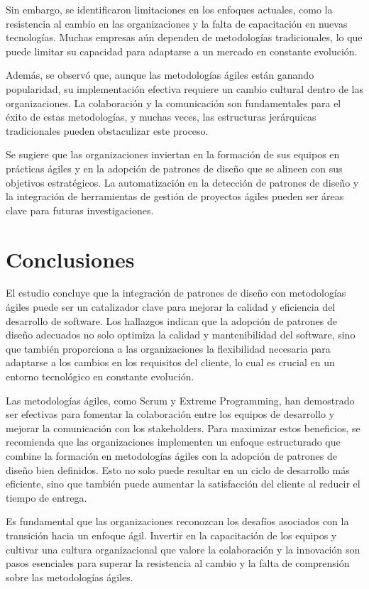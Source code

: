 \documentclass{article}
\begin{document}
Sin embargo, se identificaron limitaciones en los enfoques actuales, como la resistencia al cambio en las organizaciones y la falta de capacitación en nuevas tecnologías. Muchas empresas aún dependen de metodologías tradicionales, lo que puede limitar su capacidad para adaptarse a un mercado en constante evolución.

Además, se observó que, aunque las metodologías ágiles están ganando popularidad, su implementación efectiva requiere un cambio cultural dentro de las organizaciones. La colaboración y la comunicación son fundamentales para el éxito de estas metodologías, y muchas veces, las estructuras jerárquicas tradicionales pueden obstaculizar este proceso.

Se sugiere que las organizaciones inviertan en la formación de sus equipos en prácticas ágiles y en la adopción de patrones de diseño que se alineen con sus objetivos estratégicos. La automatización en la detección de patrones de diseño y la integración de herramientas de gestión de proyectos ágiles pueden ser áreas clave para futuras investigaciones.

\section{Conclusiones}
El estudio concluye que la integración de patrones de diseño con metodologías ágiles puede ser un catalizador clave para mejorar la calidad y eficiencia del desarrollo de software. Los hallazgos indican que la adopción de patrones de diseño adecuados no solo optimiza la calidad y mantenibilidad del software, sino que también proporciona a las organizaciones la flexibilidad necesaria para adaptarse a los cambios en los requisitos del cliente, lo cual es crucial en un entorno tecnológico en constante evolución.

Las metodologías ágiles, como Scrum y Extreme Programming, han demostrado ser efectivas para fomentar la colaboración entre los equipos de desarrollo y mejorar la comunicación con los stakeholders. Para maximizar estos beneficios, se recomienda que las organizaciones implementen un enfoque estructurado que combine la formación en metodologías ágiles con la adopción de patrones de diseño bien definidos. Esto no solo puede resultar en un ciclo de desarrollo más eficiente, sino que también puede aumentar la satisfacción del cliente al reducir el tiempo de entrega.

Es fundamental que las organizaciones reconozcan los desafíos asociados con la transición hacia un enfoque ágil. Invertir en la capacitación de los equipos y cultivar una cultura organizacional que valore la colaboración y la innovación son pasos esenciales para superar la resistencia al cambio y la falta de comprensión sobre las metodologías ágiles.
\end{document}
